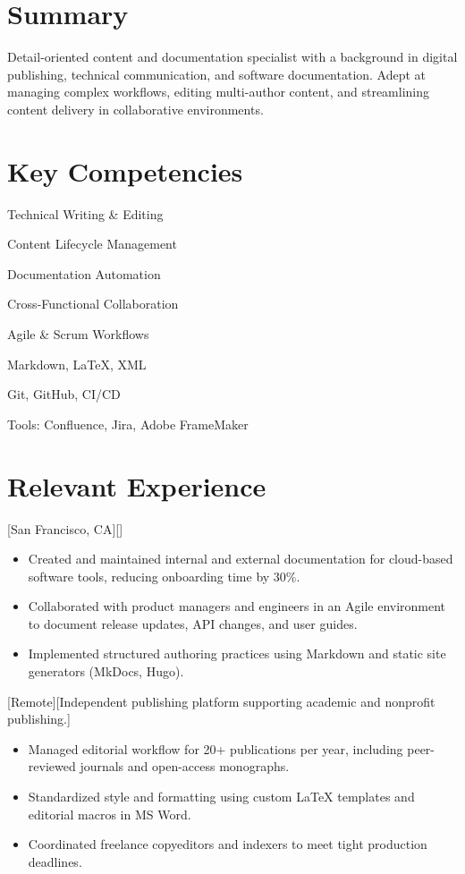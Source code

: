 \documentclass{patchworker}
\begin{document}
\section*{Summary}
Detail-oriented content and documentation specialist with a background in digital publishing, technical communication, and software documentation. Adept at managing complex workflows, editing multi-author content, and streamlining content delivery in collaborative environments.
\section*{Key Competencies}
\begin{skills}
\item Technical Writing \& Editing
\item Content Lifecycle Management
\item Documentation Automation
\item Cross-Functional Collaboration
\item Agile \& Scrum Workflows
\item Markdown, LaTeX, XML
\item Git, GitHub, CI/CD
\item Tools: Confluence, Jira, Adobe FrameMaker

\end{skills}

\section*{Relevant Experience}

        [San Francisco, CA][]
        \begin{itemize}
  \item Created and maintained internal and external documentation for cloud-based software tools, reducing onboarding time by 30\%.
  \item Collaborated with product managers and engineers in an Agile environment to document release updates, API changes, and user guides.
  \item Implemented structured authoring practices using Markdown and static site generators (MkDocs, Hugo).
\end{itemize}


        [Remote][Independent publishing platform supporting academic and nonprofit publishing.]
        \begin{itemize}
  \item Managed editorial workflow for 20+ publications per year, including peer-reviewed journals and open-access monographs.
  \item Standardized style and formatting using custom LaTeX templates and editorial macros in MS Word.
  \item Coordinated freelance copyeditors and indexers to meet tight production deadlines.
\end{itemize}
\end{document}
